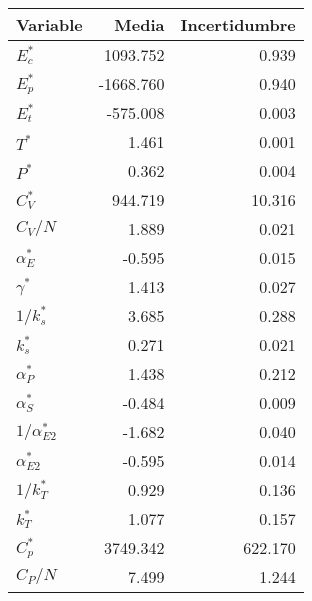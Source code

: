 \begin{tabular}{lrr}
\toprule
Variable & Media & Incertidumbre \\
\midrule
$E_c^*$ & 1093.752 & 0.939 \\
$E_p^*$ & -1668.760 & 0.940 \\
$E_t^*$ & -575.008 & 0.003 \\
$T^*$ & 1.461 & 0.001 \\
$P^*$ & 0.362 & 0.004 \\
$C_V^*$ & 944.719 & 10.316 \\
$C_V/N$ & 1.889 & 0.021 \\
$\alpha_E^*$ & -0.595 & 0.015 \\
$\gamma^*$ & 1.413 & 0.027 \\
$1/k_s^*$ & 3.685 & 0.288 \\
$k_s^*$ & 0.271 & 0.021 \\
$\alpha_P^*$ & 1.438 & 0.212 \\
$\alpha_S^*$ & -0.484 & 0.009 \\
$1/\alpha_{E2}^*$ & -1.682 & 0.040 \\
$\alpha_{E2}^*$ & -0.595 & 0.014 \\
$1/k_T^*$ & 0.929 & 0.136 \\
$k_T^*$ & 1.077 & 0.157 \\
$C_p^*$ & 3749.342 & 622.170 \\
$C_P/N$ & 7.499 & 1.244 \\
\bottomrule
\end{tabular}
